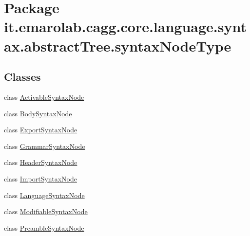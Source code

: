 \hypertarget{namespaceit_1_1emarolab_1_1cagg_1_1core_1_1language_1_1syntax_1_1abstractTree_1_1syntaxNodeType}{\section{Package it.\-emarolab.\-cagg.\-core.\-language.\-syntax.\-abstract\-Tree.\-syntax\-Node\-Type}
\label{namespaceit_1_1emarolab_1_1cagg_1_1core_1_1language_1_1syntax_1_1abstractTree_1_1syntaxNodeType}
}
\subsection*{Classes}
\begin{DoxyCompactItemize}
\item 
class \hyperlink{classit_1_1emarolab_1_1cagg_1_1core_1_1language_1_1syntax_1_1abstractTree_1_1syntaxNodeType_1_1ActivableSyntaxNode}{Activable\-Syntax\-Node}
\item 
class \hyperlink{classit_1_1emarolab_1_1cagg_1_1core_1_1language_1_1syntax_1_1abstractTree_1_1syntaxNodeType_1_1BodySyntaxNode}{Body\-Syntax\-Node}
\item 
class \hyperlink{classit_1_1emarolab_1_1cagg_1_1core_1_1language_1_1syntax_1_1abstractTree_1_1syntaxNodeType_1_1ExportSyntaxNode}{Export\-Syntax\-Node}
\item 
class \hyperlink{classit_1_1emarolab_1_1cagg_1_1core_1_1language_1_1syntax_1_1abstractTree_1_1syntaxNodeType_1_1GrammarSyntaxNode}{Grammar\-Syntax\-Node}
\item 
class \hyperlink{classit_1_1emarolab_1_1cagg_1_1core_1_1language_1_1syntax_1_1abstractTree_1_1syntaxNodeType_1_1HeaderSyntaxNode}{Header\-Syntax\-Node}
\item 
class \hyperlink{classit_1_1emarolab_1_1cagg_1_1core_1_1language_1_1syntax_1_1abstractTree_1_1syntaxNodeType_1_1ImportSyntaxNode}{Import\-Syntax\-Node}
\item 
class \hyperlink{classit_1_1emarolab_1_1cagg_1_1core_1_1language_1_1syntax_1_1abstractTree_1_1syntaxNodeType_1_1LanguageSyntaxNode}{Language\-Syntax\-Node}
\item 
class \hyperlink{classit_1_1emarolab_1_1cagg_1_1core_1_1language_1_1syntax_1_1abstractTree_1_1syntaxNodeType_1_1ModifiableSyntaxNode}{Modifiable\-Syntax\-Node}
\item 
class \hyperlink{classit_1_1emarolab_1_1cagg_1_1core_1_1language_1_1syntax_1_1abstractTree_1_1syntaxNodeType_1_1PreambleSyntaxNode}{Preamble\-Syntax\-Node}

\end{DoxyCompactItemize}
